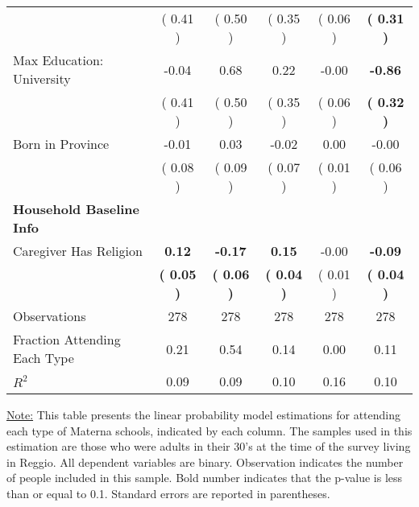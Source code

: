 \begin{table}[H]
{\begin{tabular}{lccccc}
\quad  & (     0.41 ) & (     0.50 )  & (     0.35 )  & (     0.06 ) & \textbf{(     0.31 )} \\
\quad Max Education: University &     -0.04 &      0.68 &      0.22 &     -0.00 & \textbf{    -0.86} \\
\quad  & (     0.41 ) & (     0.50 )  & (     0.35 )  & (     0.06 ) & \textbf{(     0.32 )} \\
\quad Born in Province &     -0.01 &      0.03 &     -0.02 &      0.00 &     -0.00 \\
\quad  & (     0.08 ) & (     0.09 )  & (     0.07 )  & (     0.01 ) & (     0.06 ) \\
\midrule
\textbf{Household Baseline Info} \\
\quad Caregiver Has Religion & \textbf{     0.12} & \textbf{    -0.17} & \textbf{     0.15} &     -0.00 & \textbf{    -0.09} \\
\quad  & \textbf{(     0.05 )} & \textbf{(     0.06 )}  & \textbf{(     0.04 )}  & (     0.01 ) & \textbf{(     0.04 )} \\
\midrule
Observations & 278 & 278 & 278 & 278 & 278 \\
Fraction Attending Each Type &      0.21 &      0.54 &      0.14 &      0.00 &      0.11 \\
\midrule
$ R^2$ &      0.09 &      0.09 &      0.10 &      0.16 &      0.10 \\
\bottomrule
\end{tabular}}
\end{table}
\begin{scriptsize}
\noindent\underline{Note:} This table presents the linear probability model estimations for attending each type of Materna schools, indicated by each column. The samples used in this estimation are those who were adults in their 30's at the time of the survey living in Reggio. All dependent variables are binary. Observation indicates the number of people included in this sample. Bold number indicates that the p-value is less than or equal to 0.1. Standard errors are reported in parentheses.
\end{scriptsize}
